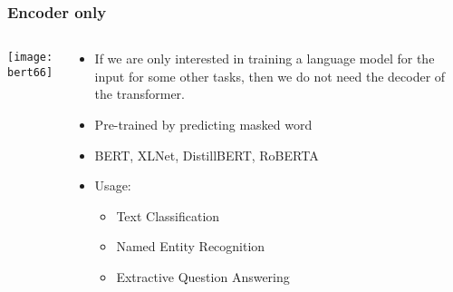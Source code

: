 

\begin{frame}[fragile]\frametitle{Encoder only}

\begin{columns}
    \begin{column}[T]{0.5\linewidth}
			\begin{center}
			\texttt{[image: bert66]}
			\end{center}		
		\end{column}
    \begin{column}[T]{0.5\linewidth}
      \begin{itemize}
			\item If we are only interested in training a language model for the input for some other tasks, then we do not need the decoder of the transformer. 
			\item Pre-trained by predicting masked word
			\item BERT, XLNet, DistillBERT, RoBERTA
			\item Usage:
      \begin{itemize}
			\item Text Classification
			\item Named Entity Recognition
			\item Extractive Question Answering
			\end{itemize}
			\end{itemize}
    \end{column}
  \end{columns}
			
\end{frame}




			


